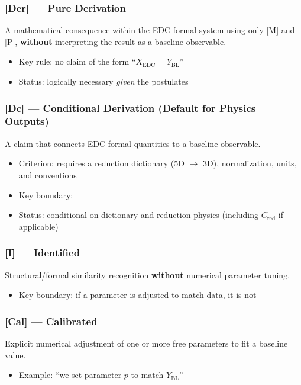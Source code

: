 \subsubsection*{[Der] --- Pure Derivation}
A mathematical consequence within the EDC formal system using only [M] and [P],
\textbf{without} interpreting the result as a baseline observable.
\begin{itemize}
\item Key rule: no claim of the form ``$X_{\mathrm{EDC}} = Y_{\mathrm{BL}}$''
\item Status: logically necessary \emph{given} the postulates
\end{itemize}

\subsubsection*{[Dc] --- Conditional Derivation (Default for Physics Outputs)}
A claim that connects EDC formal quantities to a baseline observable.
\begin{itemize}
\item Criterion: requires a reduction dictionary (5D $\to$ 3D), normalization, units, and conventions
\item Key boundary:
\begin{center}
\end{center}
\item Status: conditional on dictionary and reduction physics (including $C_{\mathrm{red}}$ if applicable)
\end{itemize}

\subsubsection*{[I] --- Identified}
Structural/formal similarity recognition \textbf{without} numerical parameter tuning.
\begin{itemize}
\item Key boundary: if a parameter is adjusted to match data, it is not \tagI{}
\end{itemize}

\subsubsection*{[Cal] --- Calibrated}
Explicit numerical adjustment of one or more free parameters to fit a baseline value.
\begin{itemize}
\item Example: ``we set parameter $p$ to match $Y_{\mathrm{BL}}$''
\end{itemize}

